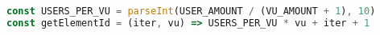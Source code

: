 \begin{lstlisting}[language=JavaScript,caption={K6 Get user ID},breaklines=true,label={lst:k6GetId}]
const USERS_PER_VU = parseInt(USER_AMOUNT / (VU_AMOUNT + 1), 10)
const getElementId = (iter, vu) => USERS_PER_VU * vu + iter + 1
\end{lstlisting}
